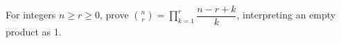 For integers $n\ge r\ge0$, prove $\displaystyle\binom nr=\prod_{k=1}^r\dfrac{n-r+k}{k}$, interpreting an empty product as 1.
